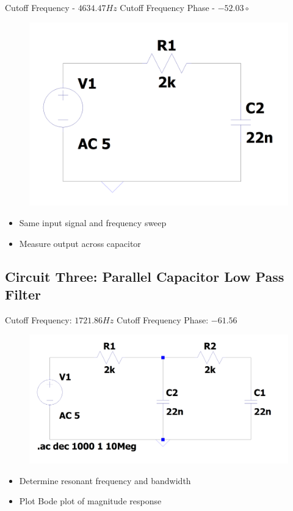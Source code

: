 \documentclass[12pt]{article}
\begin{document}
Cutoff Frequency - $4634.47Hz$
Cutoff Frequency Phase - $-52.03\circ$
\begin{figure}[H]
	\includegraphics[width=\textwidth]{e6_02}
\end{figure}
\begin{itemize}
	\item Same input signal and frequency sweep
	\item Measure output across capacitor
\end{itemize}

\subsection{Circuit Three: Parallel Capacitor Low Pass Filter}
Cutoff Frequency: $1721.86Hz$
Cutoff Frequency Phase: $-61.56$

\begin{figure}[H]
	\includegraphics[width=\textwidth]{e6_03}
\end{figure}
\begin{itemize}
	\item Determine resonant frequency and bandwidth
	\item Plot Bode plot of magnitude response
\end{itemize}
\end{document}
